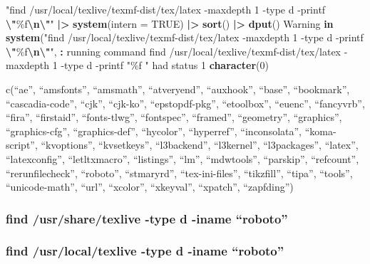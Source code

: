 \documentclass[
]{article}
\newenvironment{Shaded}{\begin{snugshade}}{\end{snugshade}}
\newcommand{\AttributeTok}[1]{\textcolor[rgb]{0.13,0.29,0.53}{#1}}
\newcommand{\ConstantTok}[1]{\textcolor[rgb]{0.56,0.35,0.01}{#1}}
\newcommand{\ControlFlowTok}[1]{\textcolor[rgb]{0.13,0.29,0.53}{\textbf{#1}}}
\newcommand{\DecValTok}[1]{\textcolor[rgb]{0.00,0.00,0.81}{#1}}
\newcommand{\FunctionTok}[1]{\textcolor[rgb]{0.13,0.29,0.53}{\textbf{#1}}}
\newcommand{\NormalTok}[1]{#1}
\newcommand{\SpecialCharTok}[1]{\textcolor[rgb]{0.81,0.36,0.00}{\textbf{#1}}}
\newcommand{\StringTok}[1]{\textcolor[rgb]{0.31,0.60,0.02}{#1}}
\begin{document}
\begin{Shaded}
\begin{Highlighting}[]
\StringTok{"find /usr/local/texlive/texmf{-}dist/tex/latex {-}maxdepth 1 {-}type d {-}printf }\SpecialCharTok{\textbackslash{}"}\StringTok{\%f}\SpecialCharTok{\textbackslash{}n\textbackslash{}"}\StringTok{"} \SpecialCharTok{|\textgreater{}}
    \FunctionTok{system}\NormalTok{(}\AttributeTok{intern =} \ConstantTok{TRUE}\NormalTok{) }\SpecialCharTok{|\textgreater{}}
    \FunctionTok{sort}\NormalTok{() }\SpecialCharTok{|\textgreater{}}
    \FunctionTok{dput}\NormalTok{()}
\NormalTok{Warning }\ControlFlowTok{in} \FunctionTok{system}\NormalTok{(}\StringTok{"find /usr/local/texlive/texmf{-}dist/tex/latex {-}maxdepth 1 {-}type d {-}printf }\SpecialCharTok{\textbackslash{}"}\StringTok{\%f}\SpecialCharTok{\textbackslash{}n\textbackslash{}"}\StringTok{"}\NormalTok{, }\SpecialCharTok{:}\NormalTok{ running command }\StringTok{\textquotesingle{}find /usr/local/texlive/texmf{-}dist/tex/latex {-}maxdepth 1 {-}type d {-}printf "\%f}
\StringTok{"\textquotesingle{}}\NormalTok{ had status }\DecValTok{1}
\FunctionTok{character}\NormalTok{(}\DecValTok{0}\NormalTok{)}
\end{Highlighting}
\end{Shaded}

c(``ae'', ``amsfonts'', ``amsmath'', ``atveryend'', ``auxhook'',
``base'', ``bookmark'', ``cascadia-code'', ``cjk'', ``cjk-ko'',
``epstopdf-pkg'', ``etoolbox'', ``euenc'', ``fancyvrb'', ``fira'',
``firstaid'', ``fonts-tlwg'', ``fontspec'', ``framed'', ``geometry'',
``graphics'', ``graphics-cfg'', ``graphics-def'', ``hycolor'',
``hyperref'', ``inconsolata'', ``koma-script'', ``kvoptions'',
``kvsetkeys'', ``l3backend'', ``l3kernel'', ``l3packages'', ``latex'',
``latexconfig'', ``letltxmacro'', ``listings'', ``lm'', ``mdwtools'',
``parskip'', ``refcount'', ``rerunfilecheck'', ``roboto'', ``stmaryrd'',
``tex-ini-files'', ``tikzfill'', ``tipa'', ``tools'', ``unicode-math'',
``url'', ``xcolor'', ``xkeyval'', ``xpatch'', ``zapfding'')

\hypertarget{find-usrsharetexlive--type-d--iname-roboto}{%
\subsubsection{find /usr/share/texlive -type d -iname
``roboto''}\label{find-usrsharetexlive--type-d--iname-roboto}}

\hypertarget{find-usrlocaltexlive--type-d--iname-roboto}{%
\subsubsection{find /usr/local/texlive -type d -iname
``roboto''}\label{find-usrlocaltexlive--type-d--iname-roboto}}
\end{document}
